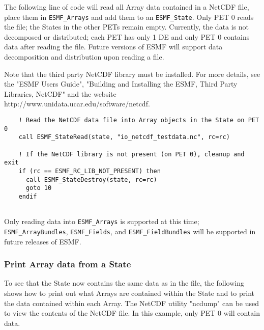 
    The following line of code will read all Array data contained in a NetCDF
    file, place them in {\tt ESMF\_Arrays} and add them to an {\tt ESMF\_State}.
    Only PET 0 reads the file; the States in the other PETs remain empty.
    Currently, the data is not decomposed or distributed; each PET
    has only 1 DE and only PET 0 contains data after reading the file.
    Future versions of ESMF will support data decomposition and distribution
    upon reading a file.
  
    Note that the third party NetCDF library must be installed.  For more
    details, see the "ESMF Users Guide", 
    "Building and Installing the ESMF, Third Party Libraries, NetCDF" and
    the website http://www.unidata.ucar.edu/software/netcdf. 

 \begin{verbatim}
    ! Read the NetCDF data file into Array objects in the State on PET 0
    call ESMF_StateRead(state, "io_netcdf_testdata.nc", rc=rc)

    ! If the NetCDF library is not present (on PET 0), cleanup and exit 
    if (rc == ESMF_RC_LIB_NOT_PRESENT) then
      call ESMF_StateDestroy(state, rc=rc)
      goto 10
    endif
 
\end{verbatim}
 

    Only reading data into {\tt ESMF\_Arrays} is supported at this time;
    {\tt ESMF\_ArrayBundles}, {\tt ESMF\_Fields}, and {\tt ESMF\_FieldBundles}
    will be supported in future releases of ESMF. 

  \subsubsection{Print Array data from a State}
  
    To see that the State now contains the same data as in the file, the
    following shows how to print out what Arrays are contained within the
    State and to print the data contained within each Array.  The NetCDF utility
    "ncdump" can be used to view the contents of the NetCDF file.
    In this example, only PET 0 will contain data. 

